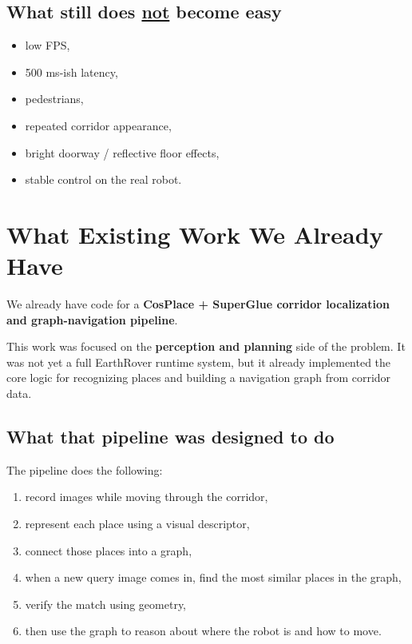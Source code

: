 \documentclass[11pt,a4paper]{article}
\begin{document}
\subsection*{What still does \underline{not} become easy}

\begin{itemize}[nosep]
  \item low FPS,
  \item 500 ms-ish latency,
  \item pedestrians,
  \item repeated corridor appearance,
  \item bright doorway / reflective floor effects,
  \item stable control on the real robot.
\end{itemize}


\section{What Existing Work We Already Have}

We already have code for a \textbf{CosPlace + SuperGlue corridor localization and graph-navigation pipeline}.

This work was focused on the \textbf{perception and planning} side of the problem.
It was not yet a full EarthRover runtime system, but it already implemented the
core logic for recognizing places and building a navigation graph from corridor data.

\subsection*{What that pipeline was designed to do}

The pipeline does the following:

\begin{enumerate}[nosep]
  \item record images while moving through the corridor,
  \item represent each place using a visual descriptor,
  \item connect those places into a graph,
  \item when a new query image comes in, find the most similar places in the graph,
  \item verify the match using geometry,
  \item then use the graph to reason about where the robot is and how to move.
\end{enumerate}
\end{document}
